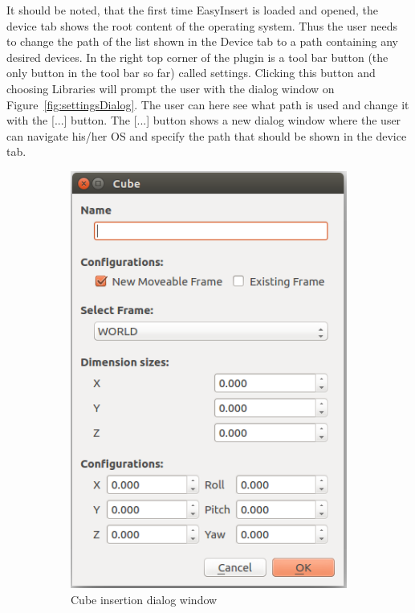 It should be noted, that the first time EasyInsert is loaded and opened, the device tab shows the root content of the operating system. Thus the user needs to change the path of the list shown in the Device tab to a path containing any desired devices. In the right top corner of the plugin is a tool bar button (the only button in the tool bar so far) called settings. Clicking this button and choosing Libraries will prompt the user with the dialog window on Figure~\ref{fig:settingsDialog}. The user can here see what path is used and change it with the [...] button. The [...] button shows a new dialog window where the user can navigate his/her OS and specify the path that should be shown in the device tab.\\

\begin{figure}[h] %
     \centering
     \begin{subfigure}[b]{0.45\textwidth}
	  \includegraphics[scale=0.7]{Figures/EasyInsertCubeDialog.png}
       \caption{Cube insertion dialog window}\label{fig:cubeDialog}
     \end{subfigure}
     \hfill
     \begin{minipage}[b]{0.45\textwidth}
       \begin{subfigure}[b]{\linewidth}

\end{subfigure}
\end{minipage}
\end{figure}
